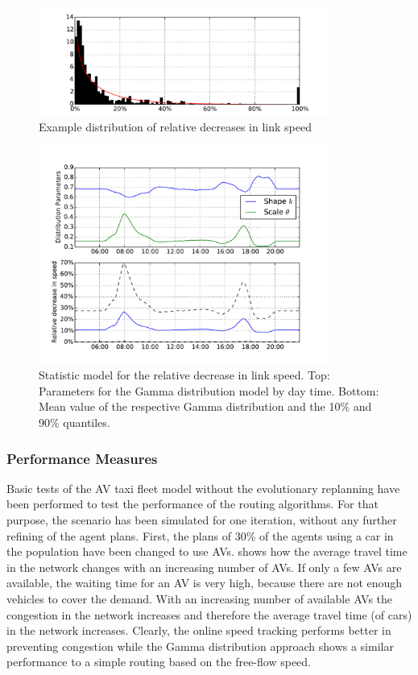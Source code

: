 \begin{figure}
    \centering
    \includegraphics[width=0.85\textwidth]{figures/speeddecdist.pdf}
    \caption{Example distribution of relative decreases in link speed}
    \label{fig:speeddecdist}
\end{figure}

\begin{figure}
    \centering
    \includegraphics[width=0.85\textwidth]{figures/randommodel.pdf}
    \caption{Statistic model for the relative decrease in link speed. Top: Parameters
    for the Gamma distribution model by day time. Bottom: Mean value of the respective
    Gamma distribution and the 10\% and 90\% quantiles.}
    \label{fig:randommodel}
\end{figure}

\subsubsection{Performance Measures}
\label{sec:routingperf}

Basic tests of the AV taxi fleet model without the evolutionary replanning have been performed to test the
performance of the routing algorithms. For that purpose, the scenario has been
simulated for one iteration, without any further refining of the agent plans.
First, the plans of 30\% of the agents using a car in the population have been
changed to use AVs.  shows how
the average travel time in the network changes with an increasing number of AVs.
If only a few AVs are available, the waiting time for an AV is very high, because
there are not enough vehicles to cover the demand. With an increasing number of
available AVs the congestion in the network increases and therefore the average
travel time (of cars) in the network increases. Clearly, the online speed tracking performs
better in preventing congestion while the Gamma distribution approach shows a
similar performance to a simple routing based on the free-flow speed.

